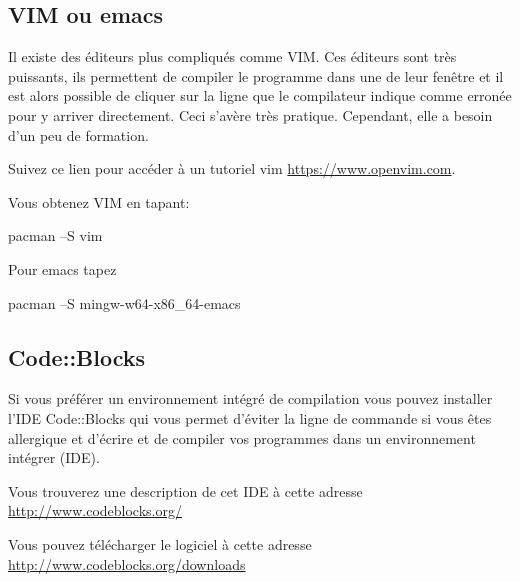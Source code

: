\documentclass{article}
\begin{document}
\subsection{VIM ou emacs}
Il existe des éditeurs plus compliqués comme VIM. Ces éditeurs sont très puissants, ils permettent de compiler le programme dans une de leur fenêtre et il est alors possible de cliquer sur la ligne que le compilateur indique comme erronée pour y arriver directement. Ceci s’avère très pratique. Cependant, elle a besoin d'un peu de formation.

Suivez ce lien pour accéder à un tutoriel vim \href{https://www.openvim.com}{https://www.openvim.com}.

Vous obtenez VIM en tapant: 
\begin{tcolorbox}[width=\textwidth,colframe=Purple,colback={black},title={Ceci est la console MSYS2 Shell},outer arc=0mm,colupper=white]    
      pacman –S vim
\end{tcolorbox}
Pour emacs tapez 
\begin{tcolorbox}[width=\textwidth,colframe=Purple,colback={black},title={Ceci est la console MSYS2 Shell},outer arc=0mm,colupper=white]    
      pacman –S mingw-w64-x86\_64-emacs
\end{tcolorbox}

\subsection{Code::Blocks}
Si vous préférer un environnement intégré de compilation vous pouvez installer l'IDE Code::Blocks qui vous permet d'éviter la ligne de commande si vous êtes allergique et d'écrire et de compiler vos programmes dans un environnement intégrer (IDE).

Vous trouverez une description de cet IDE à cette adresse \href{http://www.codeblocks.org/}{http://www.codeblocks.org/}

Vous pouvez télécharger le logiciel à cette adresse \href{http://www.codeblocks.org/downloads}{http://www.codeblocks.org/downloads}
\end{document}
